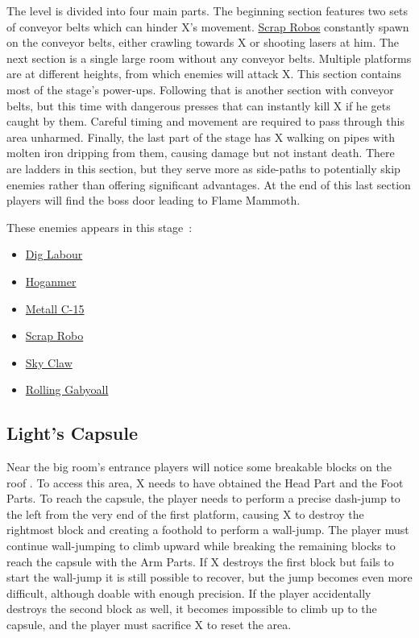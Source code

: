 The level is divided into four main parts. The beginning section features two sets of conveyor belts which can hinder X's movement. \hyperlink{enem:Scrap_Robo}{Scrap Robos} constantly spawn on the conveyor belts, either crawling towards X or shooting lasers at him. The next section is a single large room without any conveyor belts. Multiple platforms are at different heights, from which enemies will attack X. This section contains most of the stage's power-ups. Following that is another section with conveyor belts, but this time with dangerous presses that can instantly kill X if he gets caught by them. Careful timing and movement are required to pass through this area unharmed. Finally, the last part of the stage has X walking on pipes with molten iron dripping from them, causing damage but not instant death. There are ladders in this section, but they serve more as side-paths to potentially skip enemies rather than offering significant advantages. At the end of this last section players will find the boss door leading to Flame Mammoth.

These enemies appears in this stage~\cite{wiki:Factory}:
\begin{itemize}
	\item \hyperlink{enem:Dig_Labour}{Dig Labour} 
	\item \hyperlink{enem:Hoganmer}{Hoganmer}
	\item \hyperlink{enem:Metall_C-15}{Metall C-15}
	\item \hyperlink{enem:Scrap_Robo}{Scrap Robo}
	\item \hyperlink{enem:Sky_Claw}{Sky Claw}
	\item \hyperlink{enem:Rolling_Gabyoall}{Rolling Gabyoall}
\end{itemize}

\subsection{Light's Capsule}
Near the big room's entrance players will notice some breakable blocks on the roof . To access this area, X needs to have obtained the Head Part and the Foot Parts. To reach the capsule, the player needs to perform a precise dash-jump to the left from the very end of the first platform, causing X to destroy the rightmost block and creating a foothold to perform a wall-jump. The player must continue wall-jumping to climb upward while breaking the remaining blocks to reach the capsule with the Arm Parts. If X destroys the first block but fails to start the wall-jump it is still possible to recover, but the jump becomes even more difficult, although doable with enough precision. If the player accidentally destroys the second block as well, it becomes impossible to climb up to the capsule, and the player must sacrifice X to reset the area.

